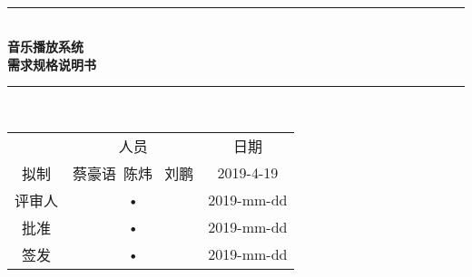 \documentclass[bachelor]{ustcthesis}
\newcommand{\docname}{音乐播放系统}
\newcommand{\HRule}{\rule{\linewidth}{0.5mm}}
\begin{document}
\begin{titlepage}
\begin{center}
~\\[5cm]
\HRule \\[0.4cm]
{\huge \bfseries \docname\\需求规格说明书}\\[0.4cm]
\HRule \\[1.5cm]

\begin{tabular}{ccc}
  & 人员 & 日期 \\ 
拟制 & 蔡豪语\ 陈炜 \ 刘鹏 & 2019-4-19 \\ 
评审人 & • & 2019-mm-dd \\ 
批准 & • & 2019-mm-dd \\ 
签发 & • & 2019-mm-dd \\ 
\end{tabular} 

\end{center}
\end{titlepage}



\frontmatter

\tableofcontents
\listoffigures
\listoftables
% 

\mainmatter









%


\appendix


\end{document}
